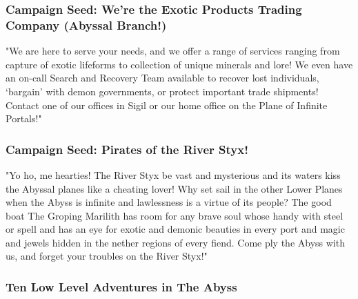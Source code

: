 \subsubsection{Campaign Seed: We're the Exotic Products Trading Company (Abyssal Branch!)}

"We are here to serve your needs, and we offer a range of services ranging from capture of exotic lifeforms to collection of unique minerals and lore! We even have an on-call Search and Recovery Team available to recover lost individuals, `bargain' with demon governments, or protect important trade shipments! Contact one of our offices in Sigil or our home office on the Plane of Infinite Portals!"

\subsubsection{Campaign Seed: Pirates of the River Styx!}

"Yo ho, me hearties! The River Styx be vast and mysterious and its waters kiss the Abyssal planes like a cheating lover! Why set sail in the other Lower Planes when the Abyss is infinite and lawlessness is a virtue of its people? The good boat The Groping Marilith has room for any brave soul whose handy with steel or spell and has an eye for exotic and demonic beauties in every port and magic and jewels hidden in the nether regions of every fiend. Come ply the Abyss with us, and forget your troubles on the River Styx!"

\subsubsection{Ten Low Level Adventures in The Abyss}

